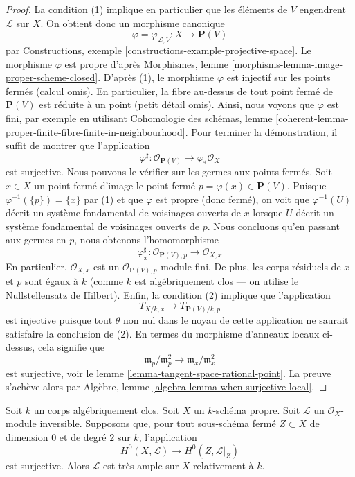 \begin{proof}
La condition (1) implique en particulier que les éléments de $V$ engendrent
$\mathcal{L}$ sur $X$. On obtient donc un morphisme canonique
$$
\varphi = \varphi_{\mathcal{L}, V} :
X
\longrightarrow
\mathbf{P}(V)
$$
par Constructions, exemple
\ref{constructions-example-projective-space}. Le morphisme
$\varphi$ est propre d'après Morphismes, lemme
\ref{morphisms-lemma-image-proper-scheme-closed}. D'après (1),
le morphisme $\varphi$ est injectif sur les points fermés (calcul
omis). En particulier, la fibre au-dessus de tout point fermé de
$\mathbf{P}(V)$ est réduite à un point (petit détail omis). Ainsi, nous voyons
que $\varphi$ est fini, par exemple en utilisant Cohomologie des
schémas, lemme
\ref{coherent-lemma-proper-finite-fibre-finite-in-neighbourhood}. Pour terminer la démonstration, il suffit de montrer que l'application
$$
\varphi^\sharp :
\mathcal{O}_{\mathbf{P}(V)}
\longrightarrow
\varphi_*\mathcal{O}_X
$$
est surjective. Nous pouvons le vérifier sur les germes aux
points fermés. Soit $x \in X$ un point fermé d'image le point
fermé $p = \varphi(x) \in \mathbf{P}(V)$. Puisque
$\varphi^{-1}(\{p\}) = \{x\}$ par (1) et que $\varphi$ est
propre (donc fermé), on voit que $\varphi^{-1}(U)$ décrit un
système fondamental de voisinages ouverts de $x$ lorsque $U$
décrit un système fondamental de voisinages ouverts de $p$. Nous
concluons qu'en passant aux germes en $p$, nous obtenons l'homomorphisme
$$
\varphi^\sharp_x :
\mathcal{O}_{\mathbf{P}(V), p}
\longrightarrow
\mathcal{O}_{X, x}
$$
En particulier, $\mathcal{O}_{X, x}$ est un
$\mathcal{O}_{\mathbf{P}(V), p}$-module fini. De plus, les
corps résiduels de $x$ et $p$ sont égaux à $k$ (comme $k$
est algébriquement clos --- on utilise le Nullstellensatz de
Hilbert). Enfin, la condition (2) implique que l'application
$$
T_{X/k, x} \longrightarrow T_{\mathbf{P}(V)/k, p}
$$
est injective puisque tout $\theta$ non nul dans le noyau de cette
application ne saurait satisfaire la conclusion de (2). En
termes du morphisme d'anneaux locaux ci-dessus, cela signifie que
$$
\mathfrak m_p/\mathfrak m_p^2 \longrightarrow
\mathfrak m_x/\mathfrak m_x^2
$$
est surjective, voir le lemme
\ref{lemma-tangent-space-rational-point}. La preuve s'achève
alors par Algèbre, lemme \ref{algebra-lemma-when-surjective-local}.
\end{proof}

\begin{lemma}
\label{lemma-variant-separate-points-tangent-vectors}
Soit $k$ un corps algébriquement clos.
Soit $X$ un $k$-schéma propre. Soit
$\mathcal{L}$ un $\mathcal{O}_X$-module
inversible. Supposons que, pour tout sous-schéma fermé $Z
\subset X$ de dimension $0$ et de degré $2$ sur $k$, l'application
$$
H^0(X, \mathcal{L}) \longrightarrow H^0(Z, \mathcal{L}|_Z)
$$
est surjective. Alors $\mathcal{L}$ est très ample sur $X$ relativement à $k$.
\end{lemma}

